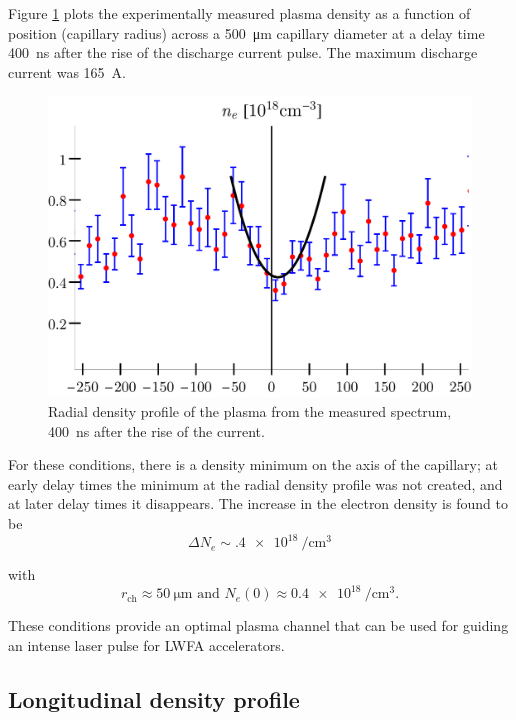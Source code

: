 \documentclass[../main.tex]{subfiles}
\begin{document}
Figure \ref{fig:plasma_channel_spectro} plots the experimentally measured plasma density as a function of position (capillary radius) across a \SI{500}{\um} capillary diameter at a delay time \SI{400}{\ns} after the rise of the discharge current pulse. The maximum discharge current was \SI{165}{\A}.

\begin{figure}
\centering
\includegraphics[width=\textwidth]{figures/spectro/parabolic.pdf}
\caption{Radial density profile of the plasma from the measured spectrum, \SI{400}{\ns} after the rise of the current.}
\label{fig:plasma_channel_spectro}
\end{figure}

For these conditions, there is a density minimum on the axis of the capillary; at early delay times the minimum at the radial density profile was not created, and at later delay times it disappears. The increase in the electron density is found to be 
\begin{equation}
    \Delta N_e \sim \SI{.4e18}{\per\cubic\cm}
\end{equation}

with
\begin{equation}
r_\text{ch}\approx \SI{50}{\um} \text{ and } N_e\left(0\right)\approx \SI{0.4e18}{\per\cubic\cm}.
\end{equation}

These conditions provide an optimal plasma channel that can be used for guiding an intense laser pulse for LWFA accelerators.

\subsection{Longitudinal density profile}\label{ssec:longi}
\end{document}
